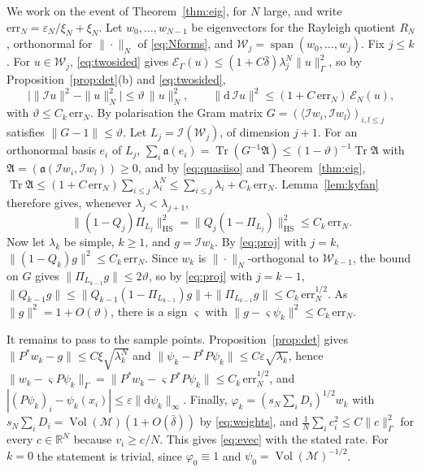 \documentclass[11pt,a4paper]{article}
\makeatletter
\theoremstyle{stmt}
\theoremstyle{defn}
\theoremstyle{rmk}
\renewenvironment{proof}[1][\proofname]{\par\pushQED{\qed}\normalfont\topsep6\p@\@plus6\p@\relax
  \trivlist\item[\hskip\labelsep{\sffamily\itshape\small #1.}]\ignorespaces}{\popQED\endtrivlist\@endpefalse}
\numberwithin{equation}{section}
\DeclareMathOperator{\Tr}{Tr}
\DeclareMathOperator{\Vol}{Vol}
\newcommand{\M}{\mathcal{M}}
\newcommand{\R}{\mathbb{R}}
\newcommand{\dd}{\mathrm{d}}
\makeatother
\begin{document}
\begin{proof}[Proof of Theorem~\ref{thm:evec}]
We work on the event of Theorem~\ref{thm:eig}, for $N$ large, and write $\mathrm{err}_N=\varepsilon_N/\xi_N+\xi_N$. Let $w_0,\dots,w_{N-1}$ be eigenvectors for the Rayleigh quotient $R_N$, orthonormal for $\|\cdot\|_N$ of \eqref{eq:Nforms}, and $\mathcal W_j=\operatorname{span}(w_0,\dots,w_j)$. Fix $j\le k$. For $u\in\mathcal W_j$, \eqref{eq:twosided} gives $\mathcal E_\Gamma(u)\le(1+C\bar\delta)\lambda_j^N\|u\|_\Gamma^2$, so by Proposition~\ref{prop:det}(b) and \eqref{eq:twosided},
\begin{equation}\label{eq:quasiiso}
\big|\|\mathcal Iu\|^2-\|u\|_N^2\big|\le\vartheta\,\|u\|_N^2,\qquad \|\dd\,\mathcal Iu\|^2\le(1+C\,\mathrm{err}_N)\,\mathcal E_N(u),
\end{equation}
with $\vartheta\le C_k\,\mathrm{err}_N$. By polarisation the Gram matrix $G=(\langle\mathcal Iw_i,\mathcal Iw_l\rangle)_{i,l\le j}$ satisfies $\|G-1\|\le\vartheta$. Let $L_j=\mathcal I(\mathcal W_j)$, of dimension $j+1$. For an orthonormal basis $e_i$ of $L_j$, $\sum_i\mathfrak a(e_i)=\Tr(G^{-1}\mathfrak A)\le(1-\vartheta)^{-1}\Tr\mathfrak A$ with $\mathfrak A=(\mathfrak a(\mathcal Iw_i,\mathcal Iw_l))\ge0$, and by \eqref{eq:quasiiso} and Theorem~\ref{thm:eig}, $\Tr\mathfrak A\le(1+C\,\mathrm{err}_N)\sum_{i\le j}\lambda_i^N\le\sum_{i\le j}\lambda_i+C_k\,\mathrm{err}_N$. Lemma~\ref{lem:kyfan} therefore gives, whenever $\lambda_j<\lambda_{j+1}$,
\begin{equation}\label{eq:proj}
\|(1-Q_j)\Pi_{L_j}\|_{\mathrm{HS}}^2=\|Q_j(1-\Pi_{L_j})\|_{\mathrm{HS}}^2\le C_k\,\mathrm{err}_N .
\end{equation}
Now let $\lambda_k$ be simple, $k\ge1$, and $g=\mathcal Iw_k$. By \eqref{eq:proj} with $j=k$, $\|(1-Q_k)g\|^2\le C_k\,\mathrm{err}_N$. Since $w_k$ is $\|\cdot\|_N$-orthogonal to $\mathcal W_{k-1}$, the bound on $G$ gives $\|\Pi_{L_{k-1}}g\|\le2\vartheta$, so by \eqref{eq:proj} with $j=k-1$, $\|Q_{k-1}g\|\le\|Q_{k-1}(1-\Pi_{L_{k-1}})g\|+\|\Pi_{L_{k-1}}g\|\le C_k\,\mathrm{err}_N^{1/2}$. As $\|g\|^2=1+O(\vartheta)$, there is a sign $\varsigma$ with $\|g-\varsigma\psi_k\|^2\le C_k\,\mathrm{err}_N$.

It remains to pass to the sample points. Proposition~\ref{prop:det} gives $\|P^*w_k-g\|\le C\xi\sqrt{\lambda_k^N}$ and $\|\psi_k-P^*P\psi_k\|\le C\varepsilon\sqrt{\lambda_k}$, hence $\|w_k-\varsigma P\psi_k\|_\Gamma=\|P^*w_k-\varsigma P^*P\psi_k\|\le C_k\,\mathrm{err}_N^{1/2}$, and $|(P\psi_k)_i-\psi_k(x_i)|\le\varepsilon\|\dd\psi_k\|_\infty$. Finally, $\varphi_k=(s_N\sum_iD_i)^{1/2}w_k$ with $s_N\sum_iD_i=\Vol(\M)(1+O(\bar\delta))$ by \eqref{eq:weights}, and $\tfrac1N\sum_ic_i^2\le C\|c\|_\Gamma^2$ for every $c\in\R^N$ because $v_i\ge c/N$. This gives \eqref{eq:evec} with the stated rate. For $k=0$ the statement is trivial, since $\varphi_0\equiv1$ and $\psi_0=\Vol(\M)^{-1/2}$.
\end{proof}
\end{document}
